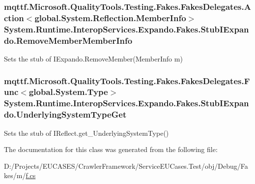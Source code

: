 \hypertarget{class_system_1_1_runtime_1_1_interop_services_1_1_expando_1_1_fakes_1_1_stub_i_expando_aafa8eb788e80aa4aa5cc421919ff2e03}{
\subsubsection[{Remove\-Member\-Member\-Info}]{\setlength{\rightskip}{0pt plus 5cm}mqttf.\-Microsoft.\-Quality\-Tools.\-Testing.\-Fakes.\-Fakes\-Delegates.\-Action$<$global.\-System.\-Reflection.\-Member\-Info$>$ System.\-Runtime.\-Interop\-Services.\-Expando.\-Fakes.\-Stub\-I\-Expando.\-Remove\-Member\-Member\-Info}}\label{class_system_1_1_runtime_1_1_interop_services_1_1_expando_1_1_fakes_1_1_stub_i_expando_aafa8eb788e80aa4aa5cc421919ff2e03}


Sets the stub of I\-Expando.\-Remove\-Member(\-Member\-Info m)

\hypertarget{class_system_1_1_runtime_1_1_interop_services_1_1_expando_1_1_fakes_1_1_stub_i_expando_a7c0345f9f4bc303463818294e2d487dd}{
\subsubsection[{Underlying\-System\-Type\-Get}]{\setlength{\rightskip}{0pt plus 5cm}mqttf.\-Microsoft.\-Quality\-Tools.\-Testing.\-Fakes.\-Fakes\-Delegates.\-Func$<$global.\-System.\-Type$>$ System.\-Runtime.\-Interop\-Services.\-Expando.\-Fakes.\-Stub\-I\-Expando.\-Underlying\-System\-Type\-Get}}\label{class_system_1_1_runtime_1_1_interop_services_1_1_expando_1_1_fakes_1_1_stub_i_expando_a7c0345f9f4bc303463818294e2d487dd}


Sets the stub of I\-Reflect.\-get\-\_\-\-Underlying\-System\-Type()



The documentation for this class was generated from the following file\-:\begin{DoxyCompactItemize}
\item 
D\-:/\-Projects/\-E\-U\-C\-A\-S\-E\-S/\-Crawler\-Framework/\-Service\-E\-U\-Cases.\-Test/obj/\-Debug/\-Fakes/m/\hyperlink{m_2f_8cs}{f.\-cs}\end{DoxyCompactItemize}
